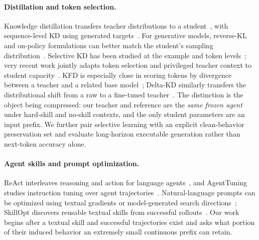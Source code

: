 \paragraph{Distillation and token selection.}
Knowledge distillation transfers teacher distributions to a student~\citep{hinton2015distilling}, with sequence-level KD using generated targets~\citep{kim2016sequence}.  For generative models, reverse-KL and on-policy formulations can better match the student's sampling distribution~\citep{gu2024minillm,agarwal2024gkd}.  Selective KD has been studied at the example and token levels~\citep{wang2021selective,tavor2026rethinking}; very recent work jointly adapts token selection and privileged teacher context to student capacity~\citep{yang2026usd}.  KFD is especially close in scoring tokens by divergence between a teacher and a related base model~\citep{yuce2026kfd}; Delta-KD similarly transfers the distributional shift from a raw to a fine-tuned teacher~\citep{cao2025delta}.  The distinction is the object being compressed: our teacher and reference are the \emph{same frozen agent} under hard-skill and no-skill contexts, and the only student parameters are an input prefix.  We further pair selective learning with an explicit clean-behavior preservation set and evaluate long-horizon executable generation rather than next-token accuracy alone.

\paragraph{Agent skills and prompt optimization.}
ReAct interleaves reasoning and action for language agents~\citep{yao2023react}, and AgentTuning studies instruction tuning over agent trajectories~\citep{zeng2024agenttuning}.  Natural-language prompts can be optimized using textual gradients or model-generated search directions~\citep{pryzant2023protegi,yang2024opro,yuksekgonul2024textgrad}; SkillOpt discovers reusable textual skills from successful rollouts~\citep{guo2026skillopt}.  Our work begins after a textual skill and successful trajectories exist and asks what portion of their induced behavior an extremely small continuous prefix can retain.
